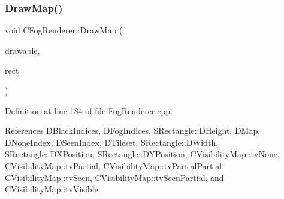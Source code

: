 \subsubsection{\texorpdfstring{Draw\+Map()}{DrawMap()}}
{\footnotesize\ttfamily void C\+Fog\+Renderer\+::\+Draw\+Map (\begin{DoxyParamCaption}\item[{Gdk\+Drawable $\ast$}]{drawable,  }\item[{const \hyperlink{structSRectangle}{S\+Rectangle} \&}]{rect }\end{DoxyParamCaption})}



Definition at line 184 of file Fog\+Renderer.\+cpp.



References D\+Black\+Indices, D\+Fog\+Indices, S\+Rectangle\+::\+D\+Height, D\+Map, D\+None\+Index, D\+Seen\+Index, D\+Tileset, S\+Rectangle\+::\+D\+Width, S\+Rectangle\+::\+D\+X\+Position, S\+Rectangle\+::\+D\+Y\+Position, C\+Visibility\+Map\+::tv\+None, C\+Visibility\+Map\+::tv\+Partial, C\+Visibility\+Map\+::tv\+Partial\+Partial, C\+Visibility\+Map\+::tv\+Seen, C\+Visibility\+Map\+::tv\+Seen\+Partial, and C\+Visibility\+Map\+::tv\+Visible.


